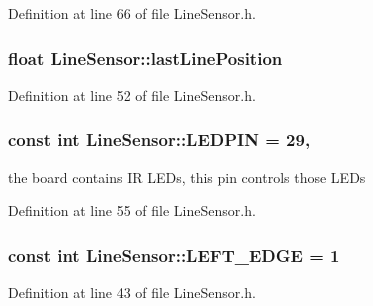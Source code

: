 Definition at line 66 of file Line\-Sensor.\-h.

\hypertarget{classLineSensor_a347e843234a242ded12e83badf4718ed}{
\subsubsection[{last\-Line\-Position}]{\setlength{\rightskip}{0pt plus 5cm}float Line\-Sensor\-::last\-Line\-Position\hspace{0.3cm}{\ttfamily [private]}}}\label{classLineSensor_a347e843234a242ded12e83badf4718ed}


Definition at line 52 of file Line\-Sensor.\-h.

\hypertarget{classLineSensor_a09da44442cb9e026af2053b5d0b4f2ce}{
\subsubsection[{L\-E\-D\-P\-I\-N}]{\setlength{\rightskip}{0pt plus 5cm}const int Line\-Sensor\-::\-L\-E\-D\-P\-I\-N = 29\hspace{0.3cm}{\ttfamily [static]}, {\ttfamily [private]}}}\label{classLineSensor_a09da44442cb9e026af2053b5d0b4f2ce}


the board contains I\-R L\-E\-Ds, this pin controls those L\-E\-Ds 



Definition at line 55 of file Line\-Sensor.\-h.

\hypertarget{classLineSensor_ab9ac72fc63ec896d4b140171c5576a1a}{
\subsubsection[{L\-E\-F\-T\-\_\-\-E\-D\-G\-E}]{\setlength{\rightskip}{0pt plus 5cm}const int Line\-Sensor\-::\-L\-E\-F\-T\-\_\-\-E\-D\-G\-E = 1\hspace{0.3cm}{\ttfamily [static]}}}\label{classLineSensor_ab9ac72fc63ec896d4b140171c5576a1a}


Definition at line 43 of file Line\-Sensor.\-h.

